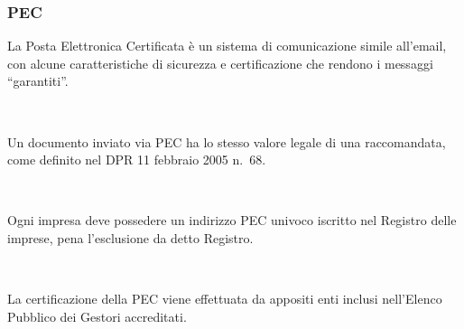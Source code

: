 \documentclass[]{beamer}
\begin{document}
\begin{frame}
\frametitle{PEC}
La Posta Elettronica Certificata è un sistema di comunicazione simile all'email, con alcune caratteristiche di \alert<1>{sicurezza e certificazione} che rendono i messaggi ``garantiti''.\pause

~

Un documento inviato via PEC ha lo stesso valore legale di una raccomandata, come definito nel DPR 11 febbraio 2005 n.~68.\pause

~

Ogni impresa deve possedere un indirizzo PEC univoco iscritto nel Registro delle imprese, pena l'esclusione da detto Registro.\pause

~

La certificazione della PEC viene effettuata da appositi enti inclusi nell'{Elenco Pubblico dei Gestori accreditati}.
\end{frame}
\end{document}
